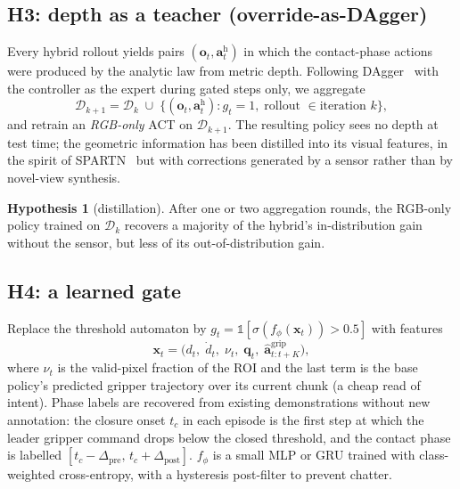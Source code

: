 \documentclass[11pt,a4paper]{article}
\theoremstyle{definition}
\newtheorem{hypothesis}{Hypothesis}
\newcommand{\obs}{\bm{o}}
\newcommand{\act}{\bm{a}}
\newcommand{\state}{\bm{q}}
\newcommand{\gate}{g}
\newcommand{\ind}{\mathbb{1}}
\begin{document}
\subsection{H3: depth as a teacher (override-as-DAgger)}
\label{sec:distill}

Every hybrid rollout yields pairs $(\obs_t,\act^{\mathrm{h}}_t)$ in which the contact-phase actions were produced by the analytic law from metric depth. Following DAgger~\citep{ross2011dagger} with the controller as the expert during gated steps only, we aggregate
\begin{equation}
\mathcal{D}_{k+1} = \mathcal{D}_k \;\cup\; \big\{(\obs_t,\act^{\mathrm{h}}_t) : \gate_t=1,\; \text{rollout } \in \text{iteration } k\big\},
\label{eq:dagger}
\end{equation}
and retrain an \emph{RGB-only} ACT on $\mathcal{D}_{k+1}$. The resulting policy sees no depth at test time; the geometric information has been distilled into its visual features, in the spirit of SPARTN~\citep{zhou2023spartn} but with corrections generated by a sensor rather than by novel-view synthesis.

\begin{hypothesis}[distillation]\label{hyp:h3}
After one or two aggregation rounds, the RGB-only policy trained on $\mathcal{D}_{k}$ recovers a majority of the hybrid's in-distribution gain without the sensor, but less of its out-of-distribution gain.
\end{hypothesis}

\subsection{H4: a learned gate}
\label{sec:gate}

Replace the threshold automaton by $\gate_t = \ind[\sigma(f_\phi(\bm{x}_t)) > 0.5]$ with features
\begin{equation}
\bm{x}_t = \big(d_t,\;\dot d_t,\;\nu_t,\;\state_t,\;\hat{\act}^{\mathrm{grip}}_{t:t+K}\big),
\end{equation}
where $\nu_t$ is the valid-pixel fraction of the ROI and the last term is the base policy's predicted gripper trajectory over its current chunk (a cheap read of intent). Phase labels are recovered from existing demonstrations without new annotation: the closure onset $t_c$ in each episode is the first step at which the leader gripper command drops below the closed threshold, and the contact phase is labelled $[t_c-\Delta_{\mathrm{pre}},\,t_c+\Delta_{\mathrm{post}}]$. $f_\phi$ is a small MLP or GRU trained with class-weighted cross-entropy, with a hysteresis post-filter to prevent chatter.
\end{document}
